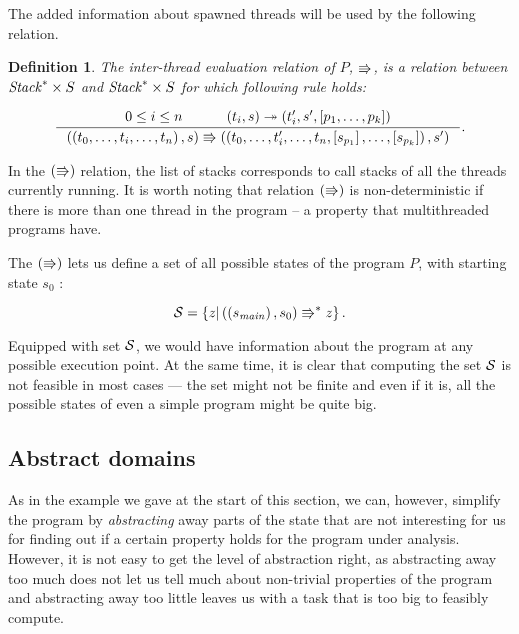 \documentclass[..thesis.tex]{subfiles}
\newtheorem{defin}{Definition}[section]
\begin{document}

The added information about spawned threads will be used by the following relation.

\begin{defin}

  The inter-thread evaluation relation of $P$, $\Rrightarrow$,
  is a relation between $\mathit{Stack}^\ast \times S$ and  $\mathit{Stack}^\ast \times S$  for which following rule holds:   

  \begin{equation*}
    \inference{ 0 \leq i \leq n  \separ \lp t_i , s \rp \intrathread \lp t'_i, s', \lbk p_1, \ldots, p_k \rbk \rp}{ \lp \lp t_0, \ldots,t_i, \ldots, t_n \rp, s \rp \interthread  \lp \lp t_0, \ldots,t'_i, \ldots, t_n, \lbk s_{p_1} \rbk, \ldots, \lbk s_{p_k} \rbk  \rp , s' \rp} \text{.}
  \end{equation*}
\end{defin}

In the $\left( \Rrightarrow \right)$ relation, the list of stacks corresponds to call stacks of all the threads currently running.
It is worth noting that relation $\left( \Rrightarrow \right)$ is non-deterministic if there is more than one thread in the program -- a property that multithreaded programs have.

The $\left( \Rrightarrow \right)$ lets us define a set of all possible states of the program $P$, with starting state $s_0$ :

\begin{equation*}
\mathcal{S} = \left\lbrace  z | \left( \left( s_{\mathit{main}} \right), s_0 \right) \Rrightarrow^{\ast} z \right\rbrace \text{.}
\end{equation*}



Equipped with set $\mathcal{S}$, we would have information about the program at any possible execution point. At the same time,
 it is clear that computing the set $\mathcal{S}$ is not feasible in most cases --- the set might not be finite and even if it is,
 all the possible states of even a simple program might be quite big.

\subsection{Abstract domains}

As in the example we gave at the start of this section, we can, however, simplify the program by \textit{abstracting} away parts
of the state that are not interesting for us for finding out if a certain property holds for the program under analysis. 
However, it is not easy to get the level of abstraction right, as abstracting away too much does not let us tell much about non-trivial properties
of the program and abstracting away too little leaves us with a task that is too big to feasibly compute.
\end{document}
